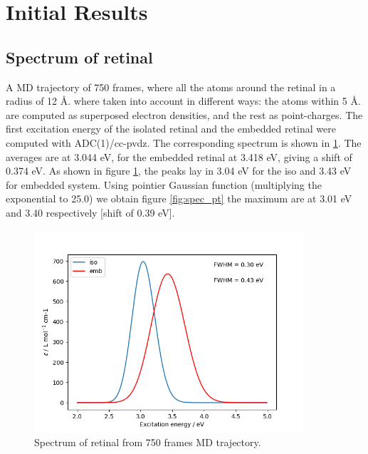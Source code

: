 \documentclass[twoside, 12pt]{article}
\begin{document}
\section{Initial Results}

\subsection{Spectrum of retinal}
\label{sec:init_results}
A MD trajectory of 750 frames, where all the atoms around the retinal in a radius of 12 \AA. where taken into account in different ways: the atoms within 5 \AA.  are computed as superposed electron densities, and the rest as point-charges.
The first excitation energy of the isolated retinal and the embedded retinal were computed with ADC(1)/cc-pvdz.
The corresponding spectrum is shown in \ref{fig:spec}. The averages are at 3.044 eV, for the embedded retinal at 3.418 eV, giving a shift of 0.374 eV.
As shown in figure \ref{fig:spec}, the peaks lay in 3.04 eV for the iso and 3.43 eV for embedded system. Using pointier Gaussian function (multiplying the exponential to 25.0) we obtain figure \ref{fig:spec_pt} the maximum are at 3.01 eV and 3.40 respectively [shift of 0.39 eV].


\begin{figure}[H]
\centering
\includegraphics[width=10cm]{./figures/both_spectrum.png}
\caption{Spectrum of retinal from 750 frames MD trajectory.} 
\label{fig:spec}
\end{figure}
\end{document}
